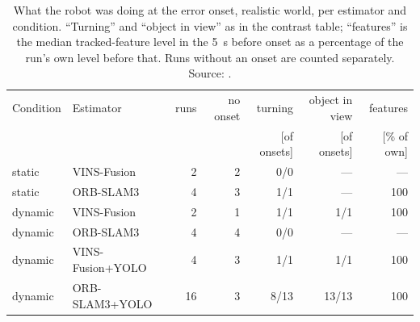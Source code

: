 \begin{table}[htbp]
\centering
\small
\caption[What the robot was doing at the onset, realistic world.]{What the robot was doing at the error onset, realistic world, per estimator and condition. ``Turning'' and ``object in view'' as in the contrast table; ``features'' is the median tracked-feature level in the \SI{5}{\second} before onset as a percentage of the run's own level before that. Runs without an onset are counted separately. Source: .}
\label{tab:insight-onset-realistic}
\begin{tabular}{llrrrrr}
\toprule
Condition & Estimator & runs & no onset & turning & object in view & features \\
 & & & & [of onsets] & [of onsets] & [\si{\percent} of own] \\
\midrule
static & VINS-Fusion & 2 & 2 & 0/0 & --- & --- \\
static & ORB-SLAM3 & 4 & 3 & 1/1 & --- & 100 \\
dynamic & VINS-Fusion & 2 & 1 & 1/1 & 1/1 & 100 \\
dynamic & ORB-SLAM3 & 4 & 4 & 0/0 & --- & --- \\
dynamic & VINS-Fusion+YOLO & 4 & 3 & 1/1 & 1/1 & 100 \\
dynamic & ORB-SLAM3+YOLO & 16 & 3 & 8/13 & 13/13 & 100 \\
\bottomrule
\end{tabular}
\end{table}
